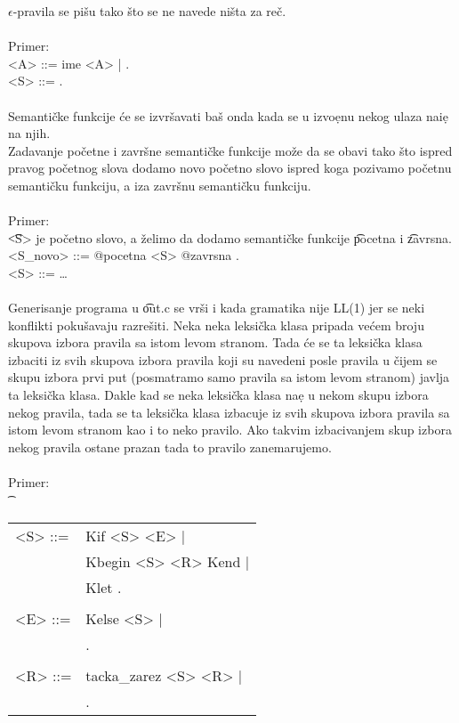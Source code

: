       $\epsilon$-pravila se pi\v su tako \v sto se ne navede ni\v sta za
      re\v c.\\
      \\
      Primer:\\
      \t
      {
        <A> ::= ime <A> | .\\
        <S> ::= .\\
      }\\
      Semanti\v cke funkcije \'ce se izvr\v savati ba\v s onda kada se u
      izvo\d enu nekog ulaza nai\d e na njih.\\
      Zadavanje po\v cetne i zavr\v sne semanti\v cke funkcije mo\v ze
      da se obavi tako \v sto ispred pravog po\v cetnog slova dodamo novo
      po\v cetno slovo ispred koga pozivamo po\v cetnu semanti\v cku
      funkciju, a iza zavr\v snu semanti\v cku funkciju.\\
      \\
      Primer:\\
      \t{<S>} je po\v cetno slovo, a \v zelimo da dodamo semanti\v cke
      funkcije \t{pocetna} i \t{zavrsna}.\\
      \t
      {
        <S\_novo> ::= @pocetna <S> @zavrsna .\\
        <S> ::= \ldots\\
      }\\
      Generisanje programa u \t{out.c} se vr\v si i kada gramatika nije
      LL(1) jer se neki konflikti poku\v savaju razre\v siti.
      Neka neka leksi\v cka klasa pripada ve\'cem broju skupova izbora
      pravila sa istom levom stranom.
      Tada \'ce se ta leksi\v cka klasa izbaciti iz svih skupova izbora
      pravila koji su navedeni posle pravila u \v cijem se skupu izbora
      prvi put (posmatramo samo pravila sa istom levom stranom) javlja
      ta leksi\v cka klasa.
      Dakle kad se neka leksi\v cka klasa na\d e u nekom skupu izbora
      nekog pravila, tada se ta leksi\v cka klasa izbacuje iz svih skupova
      izbora pravila sa istom levom stranom kao i to neko pravilo.
      Ako takvim izbacivanjem skup izbora nekog pravila ostane prazan tada
      to pravilo zanemarujemo.\\
      \\
      Primer:\\
      \t
      {
        \begin{tabular}{ll}
          <S> ::= &Kif <S> <E> |\\
                  &Kbegin <S> <R> Kend |\\
                  &Klet .\\
                  & \\
          <E> ::= &Kelse <S> |\\
                  &.\\
                  & \\
          <R> ::= &tacka\_zarez <S> <R> |\\
                  &.\\
        \end{tabular}\\
      }\\
